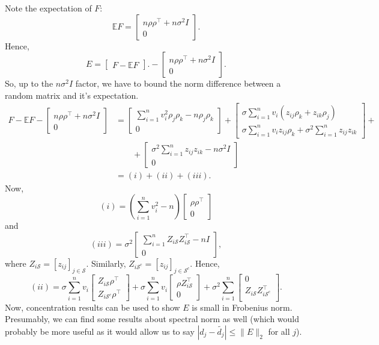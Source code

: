 \documentclass[11pt]{article}
\newcommand{\E}{\mathbb{E}}
\newcommand{\norm}[1]{\lVert #1 \rVert}
\renewcommand{\S}{\mathcal{S}}
\begin{document}
Note the expectation of $F$:
\[
\E F =
\begin{bmatrix}
n \rho\rho^{\top} + n\sigma^2 I \\
0
\end{bmatrix}.
\]
Hence, 
\[
E = 
\begin{bmatrix}
F - \E F
\end{bmatrix}.
-
\begin{bmatrix}
n \rho\rho^{\top} + n\sigma^2 I \\
0
\end{bmatrix}.
\]
So, up to the $n\sigma^2I$ factor, we have to bound the norm difference between a random matrix and it's expectation.
\begin{align}
F - \E F -
 \begin{bmatrix}
n \rho\rho^{\top} + n\sigma^2 I \\
0
\end{bmatrix}
 & =
\begin{bmatrix}
\sum_{i=1}^nv_i^2\rho_j\rho_k  - n \rho_j\rho_k\\
0
\end{bmatrix}
+
\begin{bmatrix}
\sigma \sum_{i=1}^n v_i(z_{ij}\rho_k + z_{ik}\rho_j) \\
\sigma \sum_{i=1}^n v_iz_{ij}\rho_k + \sigma^2 \sum_{i=1}^n z_{ij}z_{ik}
\end{bmatrix}
+ \\
& \qquad + 
\begin{bmatrix}
 \sigma^2 \sum_{i=1}^n z_{ij}z_{ik} - n\sigma^2 I \\
0
\end{bmatrix} \\
& = (i) + (ii) + (iii).
\end{align}
Now,
\[
(i) = 
(\sum_{i=1}^nv_i^2 -n)
\begin{bmatrix}
\rho\rho^{\top}\\
0
\end{bmatrix}
\]
and
\[
(iii) = 
\sigma^2 
\begin{bmatrix}
\sum_{i=1}^n Z_{i\S}Z_{i\S}^{\top} - n I \\
0
\end{bmatrix},
\]
where $Z_{i\S} = [z_{ij}]_{j \in \S}$. Similarly, $Z_{i\S^c} = [z_{ij}]_{j \in \S^c}$.  Hence, 
\[
(ii) = 
\sigma \sum_{i=1}^n v_i
\begin{bmatrix}
 Z_{i\S}\rho^{\top}\\
 Z_{i\S^c}\rho^{\top}
\end{bmatrix}
+
\sigma \sum_{i=1}^n v_i
\begin{bmatrix}
\rho Z_{i\S}^{\top}\\
0
\end{bmatrix}
+
\sigma^2 \sum_{i=1}^n 
\begin{bmatrix}
0 \\
Z_{i\S} Z_{i\S^c}^{\top}\\
\end{bmatrix}.
\]
Now, concentration results can be used to show $E$ is small in Frobenius norm.  Presumably, we can find some results about spectral norm as well (which would
probably be more useful as it would allow us to say $|d_j - \tilde{d_j}| \leq \norm{E}_2$ for all $j$).

\end{document}
